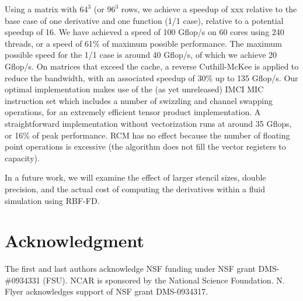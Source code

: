 \documentclass[10pt,conference,compsocconf]{IEEEtran}
\newcommand{\todo}[1]{{\color{red}\textbf{\hl{#1}}\xspace}}
\begin{document}
Using a matrix with $64^3$ (or $96^3$ rows, we achieve a speedup of
xxx relative to the base case of one derivative and one function (1/1
case), relative to a potential speedup of 16. We have achieved a
speed of 100 Gflop/s on 60 cores using 240 threads, or a speed of 61\% of
maximum possible performance. The maximum possible speed for the 1/1
case is around 40 Gflop/s, of which we achieve 20 Gflop/s. On matrices
that exceed the cache, a reverse Cuthill-McKee is applied to reduce the
bandwidth, with an associated speedup of 30\% up to 135 Gflop/s. Our
optimal implementation makes use of the (as yet unreleased) IMCI MIC instruction set 
which includes a number of swizzling and channel swapping operations, for an
extremely efficient tensor product implementation. A straightforward
implementation without vectorization runs at around 35 Gflops, or 16\% of peak
performance. RCM has no effect because the number of floating point
operations is excessive (the algorithm does not fill the vector
registers to capacity).

In a future work, we will examine the effect of larger stencil sizes,
double precision, and the actual cost of computing the derivatives
within a fluid simulation using RBF-FD.


\section*{Acknowledgment}
The first and last authors acknowledge NSF funding under NSF grant DMS-\#0934331 (FSU). 
NCAR is sponsored by the National Science Foundation. N. Flyer      
acknowledges support of NSF grant DMS-0934317.



\end{document}
